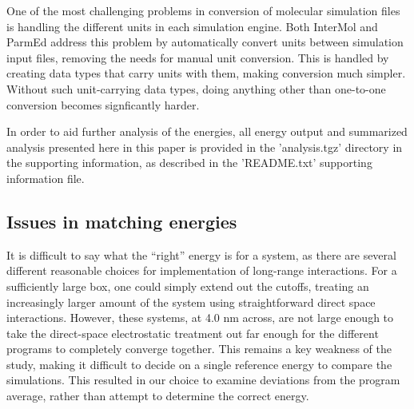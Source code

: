  One of the most challenging problems in conversion of molecular
 simulation files is handling the different units in each simulation
 engine. Both InterMol and ParmEd address this problem by
 automatically convert units between simulation input files, removing
 the needs for manual unit conversion. This is handled by creating
 data types that carry units with them, making conversion much
 simpler.  Without such unit-carrying data types, doing anything other
 than one-to-one conversion becomes signficantly harder.

In order to aid further analysis of the energies, all energy output
and summarized analysis presented here in this paper is provided in
the 'analysis.tgz' directory in the supporting information, as
described in the 'README.txt' supporting information file.

\subsection*{Issues in matching energies}

It is difficult to say what the ``right'' energy is for a system, as
there are several different reasonable choices for implementation of
long-range interactions. For a sufficiently large box, one could
simply extend out the cutoffs, treating an increasingly larger amount
of the system using straightforward direct space interactions.
However, these systems, at 4.0 nm across, are not large enough to take
the direct-space electrostatic treatment out far enough for the
different programs to completely converge together.  This remains a
key weakness of the study, making it difficult to decide on a single
reference energy to compare the simulations. This resulted in our
choice to examine deviations from the program average, rather than
attempt to determine the correct energy. 


